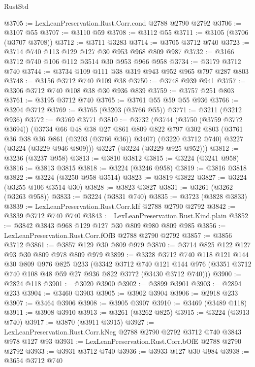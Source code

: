 \begin{lexlean}{RustStd}
\begin{coremodule}
@3705 := LexLeanPreservation.Rust.Corr.cond @2788 @2790 @2792
@3706 := @3107 @55
@3707 := @3110 @59
@3708 := @3112 @55
@3711 := @3105 (@3706 (@3707 @3708))
@3712 := @3711 @3283
@3714 := @3705 @3712 @740
@3723 := @3714 @740 @113 @129 @127 @30 @953 @968 @809 @987
@3732 := @3166 @3712 @740 @106 @112 @3514 @30 @953 @966 @958
@3734 := @3179 @3712 @740
@3744 := @3734 @109 @111 @38 @319 @943 @952 @965 @797 @287 @803
@3748 := @3156 @3712 @740 @109 @38
@3750 := @3748 @939 @941
@3757 := @3306 @3712 @740 @108 @38 @30 @936 @839
@3759 := @3757 @251 @803
@3761 := @3195 @3712 @740
@3765 := @3761 @55 @59 @55 @936
@3766 := @3204 @3712
@3769 := @3765 (@3203 (@3766 @55))
@3771 := @3211 (@3212 @936)
@3772 := @3769 @3771
@3810 := @3732
    (@3744
      (@3750 (@3759 @3772 @3694))
      (@3734
        @66
        @48
        @38
        @27
        @861
        @809
        @822
        @797
        @302
        @803
        (@3761 @36 @38 @36 @861 (@3203 (@3766 @36)) @3407)
        (@3220 @3712 @740)
        @3227
        (@3224 (@3229 @946 @809)))
      @3227
      (@3224 (@3229 @925 @952)))
@3812 := @3236 (@3237 @958)
@3813 := @3810 @3812
@3815 := @3224 (@3241 @958)
@3816 := @3813 @3815
@3818 := @3224 (@3246 @958)
@3819 := @3816 @3818
@3822 := @3224 (@3250 @958 @3514)
@3823 := @3819 @3822
@3827 := @3224 (@3255 @106 @3514 @30)
@3828 := @3823 @3827
@3831 := @3261 (@3262 (@3263 @958))
@3833 := @3224 (@3831 @740)
@3835 := @3723 (@3828 @3833)
@3839 := LexLeanPreservation.Rust.Corr.kIf @2788 @2790 @2792
@3842 := @3839 @3712 @740 @740
@3843 := LexLeanPreservation.Rust.Kind.plain
@3852 := @3842 @3843 @968 @129 @127 @30 @809 @980 @809 @985
@3856 := LexLeanPreservation.Rust.Corr.fOfB @2788 @2790 @2792
@3857 := @3856 @3712
@3861 := @3857 @129 @30 @809 @979
@3870 := @3714 @825 @122 @127 @93 @30 @809 @978 @809 @979
@3899 := @3328
    @3712
    @740
    @118
    @121
    @144
    @30
    @809
    @976
    @825
    @233
    (@3342
      @3712
      @740
      @121
      @144
      @976
      (@3351 @3712 @740 @108 @48 @59 @27 @936 @822 @3772 (@3430 @3712 @740)))
@3900 := @2824 @118
@3901 := @3020 @3900
@3902 := @3899 @3901
@3903 := @2894 @233
@3904 := @3460 @3903
@3905 := @3902 @3904
@3906 := @2918 @233
@3907 := @3464 @3906
@3908 := @3905 @3907
@3910 := @3469 (@3489 @118)
@3911 := @3908 @3910
@3913 := @3261 (@3262 @825)
@3915 := @3224 (@3913 @740)
@3917 := @3870 (@3911 @3915)
@3927 := LexLeanPreservation.Rust.Corr.kNeg @2788 @2790 @2792 @3712 @740 @3843 @978 @127 @93
@3931 := LexLeanPreservation.Rust.Corr.bOfE @2788 @2790 @2792
@3933 := @3931 @3712 @740
@3936 := @3933 @127 @30 @984
@3938 := @3654 @3712 @740

\end{coremodule}
\end{lexlean}
